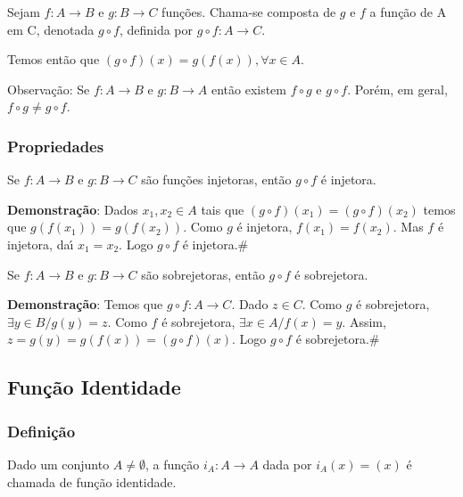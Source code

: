 \begin{definicao} Sejam $f:A\rightarrow B$ e $g:B\rightarrow C$ fun{\c c}{\~o}es. Chama-se composta de $g$ e $f$ a fun{\c c}{\~a}o de A em C, denotada $g\circ f$, definida por $g\circ f:A\rightarrow C$.\end{definicao}

Temos ent{\~a}o que $(g\circ f)(x)=g(f(x)), \forall x\in A$.

Observa{\c c}{\~a}o: Se $f:A\rightarrow B$ e $g:B\rightarrow A$ ent{\~a}o existem $f\circ g$ e $g\circ f$. Por{\'e}m, em geral, $f\circ g\neq g\circ f$.

\subsubsection{Propriedades}
\begin{proposicao} Se $f:A\rightarrow B$ e $g:B\rightarrow C$ s{\~a}o fun{\c c}{\~o}es injetoras, ent{\~a}o $g\circ f$ {\'e} injetora.\end{proposicao}

\textbf{Demonstra{\c c}{\~a}o}: Dados $x_{1},x_{2}\in A$ tais que $(g\circ f)(x_{1})=(g\circ f)(x_{2})$ temos que $g(f(x_{1}))=g(f(x_{2}))$. Como $g$ {\'e} injetora, $f(x_{1})=f(x_{2})$. Mas $f$ {\'e} injetora, da{\'\i} $x_{1}=x_{2}$. Logo $g\circ f$ {\'e} injetora.\#

\begin{proposicao} Se $f:A\rightarrow B$ e $g:B\rightarrow C$ s{\~a}o sobrejetoras, ent{\~a}o $g\circ f$ {\'e} sobrejetora.\end{proposicao}

\textbf{Demonstra{\c c}{\~a}o}: Temos que $g\circ f:A\rightarrow C$. Dado $z\in C$. Como $g$ {\'e} sobrejetora, $\exists y\in B/g(y)=z$. Como $f$ {\'e} sobrejetora, $\exists x\in A/f(x)=y$. Assim, $z=g(y)=g(f(x))=(g\circ f)(x)$. Logo $g\circ f$ {\'e} sobrejetora.\#

\subsection{Fun{\c c}{\~a}o Identidade}
\subsubsection{Defini{\c c}{\~a}o}
\begin{definicao} Dado um conjunto $A\neq\emptyset$, a fun{\c c}{\~a}o $i_{A}:A\rightarrow A$ dada por $i_{A}(x)=(x)$ {\'e} chamada de fun{\c c}{\~a}o identidade.\end{definicao}


